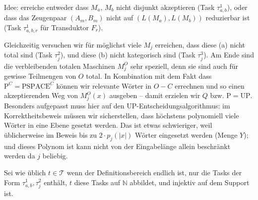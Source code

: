 \documentclass[nofonts]{uebung}
\def\P{\ensuremath{\mathrm{P}}}
\def\UP{\ensuremath{\mathrm{UP}}}
\begin{document}
Idee: erreiche entweder dass $M_a$, $M_b$ nicht disjunkt akzeptieren (Task $\tau^1_{a,b}$), oder dass das Zeugenpaar $(A_m,B_m)$ nicht auf $(L(M_a),L(M_b))$ reduzierbar ist (Task $\tau^1_{a,b,r}$ für Transduktor $F_r$).

Gleichzeitig versuchen wir für möglichst viele $M_j$ erreichen, dass diese (a) nicht total sind (Task $\tau^2_j$), und diese (b) nicht kategorisch sind (Task $\tau^3_j$).
Am Ende sind die verbleibenden totalen Maschinen $M^O_j$ sehr speziell, denn sie sind auch für gewisse Teilmengen von $O$ total.
In Kombination mit dem Fakt dass $\P^C=\mathrm{PSPACE}^C$ können wir relevante Wörter in $O-C$ errechnen und so einen akzeptierenden Weg von $M^O_j(x)$ ausgeben -- damit erzielen wir $Q$ bzw. $\P=\UP$.
Besonders aufgepasst muss hier auf den $\UP$-Entscheidungsalgorithmus: im Korrektheitsbeweis müssen wir sicherstellen, dass höchstens polynomiell viele Wörter in eine Ebene gesetzt werden. Das ist etwas schwieriger, weil üblicherweise im Beweis bis zu $2\cdot p_j(|x|)$ Wörter eingesetzt werden (Menge $Y$); und dieses Polynom ist kann nicht von der Eingabelänge allein beschränkt werden da $j$ beliebig.

Sei wie üblich $t\in \mathcal T$ wenn der Definitionsbereich endlich ist, nur die Tasks der Form $\tau^1_{a,b}, \tau^2_j$ enthält, $t$ diese Tasks auf $\mathbb N$ abbildet, und injektiv auf dem Support ist.
\end{document}
